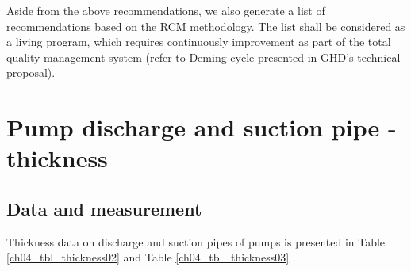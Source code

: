 Aside from the above recommendations, we also generate a list of recommendations based on the RCM methodology. The list shall be considered as a living program, which requires continuously improvement as part of the total quality management system (refer to Deming cycle presented in GHD's technical proposal).


\section{Pump discharge and suction pipe - thickness} \label{ch04mech01}
\subsection{Data and measurement}
Thickness data on discharge and suction pipes of pumps is presented in Table \ref{ch04_tbl_thickness02} and Table \ref{ch04_tbl_thickness03} .

